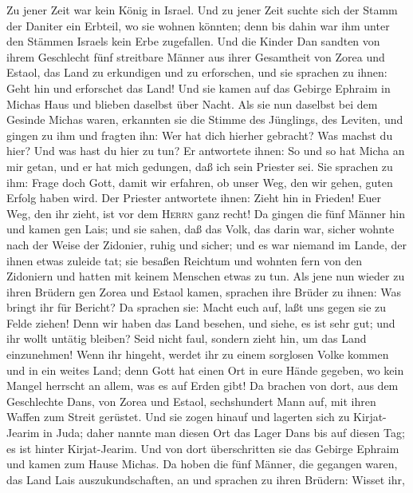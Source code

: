  Zu jener Zeit war kein König in Israel. Und zu jener Zeit
suchte sich der Stamm der Daniter ein Erbteil, wo sie wohnen könnten;
denn bis dahin war ihm unter den Stämmen Israels kein Erbe zugefallen.
 Und die Kinder Dan sandten von ihrem Geschlecht fünf
streitbare Männer aus ihrer Gesamtheit von Zorea und Estaol, das Land zu
erkundigen und zu erforschen, und sie sprachen zu ihnen: Geht hin und
erforschet das Land! Und sie kamen auf das Gebirge Ephraim in Michas
Haus und blieben daselbst über Nacht.  Als sie nun
daselbst bei dem Gesinde Michas waren, erkannten sie die Stimme des
Jünglings, des Leviten, und gingen zu ihm und fragten ihn: Wer hat dich
hierher gebracht? Was machst du hier? Und was hast du hier zu tun?
 Er antwortete ihnen: So und so hat Micha an mir getan,
und er hat mich gedungen, daß ich sein Priester sei.  Sie
sprachen zu ihm: Frage doch Gott, damit wir erfahren, ob unser Weg, den
wir gehen, guten Erfolg haben wird.  Der Priester
antwortete ihnen: Zieht hin in Frieden! Euer Weg, den ihr zieht, ist vor
dem \textsc{Herrn} ganz recht!  Da gingen die fünf Männer
hin und kamen gen Lais; und sie sahen, daß das Volk, das darin war,
sicher wohnte nach der Weise der Zidonier, ruhig und sicher; und es war
niemand im Lande, der ihnen etwas zuleide tat; sie besaßen Reichtum und
wohnten fern von den Zidoniern und hatten mit keinem Menschen etwas zu
tun.  Als jene nun wieder zu ihren Brüdern gen Zorea und
Estaol kamen, sprachen ihre Brüder zu ihnen: Was bringt ihr für Bericht?
 Da sprachen sie: Macht euch auf, laßt uns gegen sie zu
Felde ziehen! Denn wir haben das Land besehen, und siehe, es ist sehr
gut; und ihr wollt untätig bleiben? Seid nicht faul, sondern zieht hin,
um das Land einzunehmen!  Wenn ihr hingeht, werdet ihr zu
einem sorglosen Volke kommen und in ein weites Land; denn Gott hat einen
Ort in eure Hände gegeben, wo kein Mangel herrscht an allem, was es auf
Erden gibt!  Da brachen von dort, aus dem Geschlechte
Dans, von Zorea und Estaol, sechshundert Mann auf, mit ihren Waffen zum
Streit gerüstet.  Und sie zogen hinauf und lagerten sich
zu Kirjat-Jearim in Juda; daher nannte man diesen Ort das Lager Dans bis
auf diesen Tag; es ist hinter Kirjat-Jearim.  Und von
dort überschritten sie das Gebirge Ephraim und kamen zum Hause Michas.
 Da hoben die fünf Männer, die gegangen waren, das Land
Lais auszukundschaften, an und sprachen zu ihren Brüdern: Wisset ihr,
